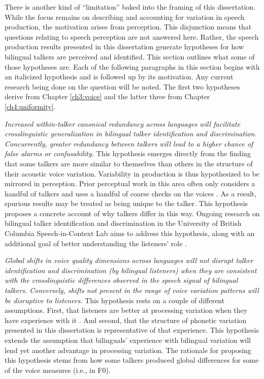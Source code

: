 There is another kind of ``limitation'' baked into the framing of this dissertation. While the focus remains on describing and accounting for variation in speech production, the motivation arises from perception. This disjunction means that questions relating to speech perception are not answered here. Rather, the speech production results presented in this dissertation generate hypotheses for how bilingual talkers are perceived and identified. This section outlines what some of those hypotheses are. Each of the following paragraphs in this section begins with an italicized hypothesis and is followed up by its motivation. Any current research being done on the question will be noted. The first two hypotheses derive from Chapter \ref{ch3:voice} and the latter three from Chapter \ref{ch4:uniformity}.

\textit{Increased within-talker canonical redundancy across languages will facilitate crosslinguistic generalization in bilingual talker identification and discrimination. Concurrently, greater redundancy between talkers will lead to a higher chance of false alarms or confusability.} This hypothesis emerges directly from the finding that some talkers are more similar to themselves than others in the structure of their acoustic voice variation. Variability in production is thus hypothesized to be mirrored in perception. Prior perceptual work in this area often only considers a handful of talkers and uses a handful of coarse checks on the voices \citep{lavan_2019_flexible}. As a result, spurious results may be treated as being unique to the talker. This hypothesis proposes a concrete account of why talkers differ in this way. Ongoing research on bilingual talker identification and discrimination in the University of British Columbia Speech-in-Context Lab aims to address this hypothesis, along with an additional goal of better understanding the listeners' role \citep{lloy_2020_bilingual, lloy_2021_examining}.

\textit{Global shifts in voice quality dimensions across languages will not disrupt talker identification and discrimination (by bilingual listeners) when they are consistent with the crosslinguistic differences observed in the speech signal of bilingual talkers. Conversely, shifts not present in the range of voice variation patterns will be disruptive to listeners.} This hypothesis rests on a couple of different assumptions. First, that listeners are better at processing variation when they have experience with it \citep[e.g., see arguments in:][]{fricke_2016_phonetic, orena_2019_identifying}. And second, that the structure of phonetic variation presented in this dissertation is representative of that experience. This hypothesis extends the assumption that bilinguals' experience with bilingual variation will lend yet another advantage in processing variation. The rationale for proposing this hypothesis stems from how some talkers produced global differences for some of the voice measures (i.e., in F0). 

